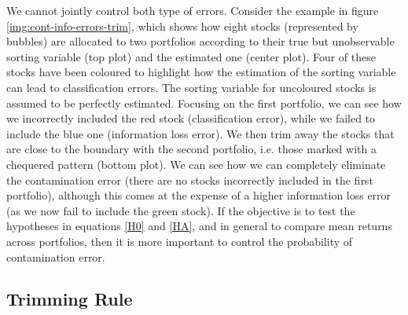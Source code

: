 We cannot jointly control both type of errors. Consider the example in figure \ref{img:cont-info-errors-trim}, which shows how eight stocks (represented by bubbles) are allocated to two portfolios according to their true but unobservable sorting variable (top plot) and the estimated one (center plot). Four of these stocks have been coloured to highlight how the estimation of the sorting variable can lead to classification errors. The sorting variable for uncoloured stocks is assumed to be perfectly estimated. Focusing on the first portfolio, we can see how we incorrectly included the red stock (classification error), while we failed to include the blue one (information loss error). We then trim away the stocks that are close to the boundary with the second portfolio, i.e. those marked with a chequered pattern (bottom plot). We can see how we can completely eliminate the contamination error (there are no stocks incorrectly included in the first portfolio), although this comes at the expense of a higher information loss error (as we now fail to include the green stock). If the objective is to test the hypotheses in equations \eqref{H0} and \eqref{HA}, and in general to compare mean returns across portfolios, then it is more important to control the probability of contamination error. 

\subsection{Trimming Rule}

